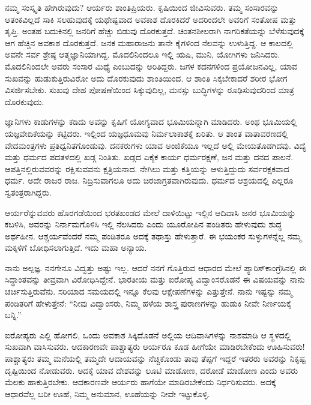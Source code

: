 ನಮ್ಮ ಸಂಸ್ಕೃತಿ ಹೇಗಿರುವುದು? ಆರ್ಯರು ಶಾಂತಿಪ್ರಿಯರು. ಕೃಷಿಯಿಂದ ಜೀವಿಸು\break ವರು. ತಮ್ಮ ಸಂಸಾರವನ್ನು ಆತಂಕವಿಲ್ಲದೆ ಸಾಕಿ ಸಲಹುವುದಕ್ಕೆ ಯಥೇಷ್ಟವಾದ ಅವಕಾಶ ದೊರಕಿದರೆ ಅದರಿಂದಲೇ ಅವರಿಗೆ ಸಂತೋಷ ಮತ್ತು ತೃಪ್ತಿ. ಅಂತಹ ಬದುಕಿನಲ್ಲಿ ಜನರಿಗೆ ಹೆಚ್ಚು ಬಿಡುವು ದೊರಕುತ್ತದೆ. ಚಿಂತನಶೀಲರಾಗಿ ನಾಗರಿಕತೆಯನ್ನು ಬೆಳೆಸುವುದಕ್ಕೆ ಆಗ ಹೆಚ್ಚಿನ ಅವಕಾಶ ದೊರಕುತ್ತದೆ. ಜನಕ ಮಹಾರಾಜನು ತಾನೇ ಕೈಗಳಿಂದ ನೆಲವನ್ನು ಉಳುತ್ತಿದ್ದ. ಆ ಕಾಲದಲ್ಲಿ ಅವನೇ ಸರ್ವ ಶ್ರೇಷ್ಠ ಆತ್ಮಜ್ಞಾನಿಯಾಗಿದ್ದ. ಮೊದಲಿನಿಂದಲೂ ಇಲ್ಲಿ ಋಷಿ, ಮುನಿ, ಯೋಗಿಗಳು ಜನಿಸಿದರು. ಮೊದಲಿನಿಂದಲೇ ಅವರು ಸಂಸಾರ ಮಿಥ್ಯೆ ಎಂಬುದನ್ನು ಅರಿತಿದ್ದರು. ಜಗಳ ಕದನಗಳಿಂದ ಪ್ರಯೋಜನವಿಲ್ಲ, ಯಾವ ಸುಖವನ್ನು ಹುಡುಕುತ್ತಿರುವಿರೋ ಅದು ದೊರಕುವುದು ಶಾಂತಿಯಿಂದ. ಆ ಶಾಂತಿ ಸಿಕ್ಕಬೇಕಾದರೆ ಶರೀರ ಭೋಗ ವಿಸರ್ಜಿಸಬೇಕು. ಸುಖವು ದೇಹ ಪೋಷಣೆಯಿಂದ ಸಿಕ್ಕುವುದಿಲ್ಲ, ಮನಸ್ಸು ಬುದ್ಧಿಗಳನ್ನು ರೂಢಿಸುವುದರಿಂದ ಮಾತ್ರ ದೊರಕುವುದು.

ಜ್ಞಾನಿಗಳು ಕಾಡುಗಳನ್ನು ಕಡಿದು ಅವನ್ನು ಕೃಷಿಗೆ ಯೋಗ್ಯವಾದ ಭೂಮಿಯನ್ನಾಗಿ ಮಾಡಿದರು. ಅಂಥ ಭೂಮಿಯಲ್ಲಿ ಯಜ್ಞವೇದಿಕೆಯನ್ನು ಕಟ್ಟಿದರು. ಇಲ್ಲಿಂದ ಯಜ್ಞ\break ಧೂಮವು ನಿರ್ಮಲಾಕಾಶಕ್ಕೆ ಏರಿತು. ಆ ಶಾಂತ ವಾತಾವರಣದಲ್ಲಿ ವೇದಮಂತ್ರಗಳು ಪ್ರತಿಧ್ವನಿತಗೊಂಡುವು. ದನಕರುಗಳು ಯಾವ ಅಂಜಿಕೆಯೂ ಇಲ್ಲದೆ ಅಲ್ಲಿ ಮೇಯ\break ತೊಡಗಿದವು. ವಿದ್ಯೆ ಮತ್ತು ಧರ್ಮದ ಪದತಳದಲ್ಲಿ ಖಡ್ಗ ನಿಂತಿತು. ಖಡ್ಗದ ಏಕೈಕ ಕಾರ್ಯ ಧರ್ಮರಕ್ಷಣೆ, ಜನ ಮತ್ತು ದನದ ಪಾಲನೆ. ಆಪತ್ತಿನಲ್ಲಿರುವವರನ್ನು ರಕ್ಷಿಸುವವನು ಕ್ಷತ್ರಿಯನಾದ. ನೇಗಿಲು ಮತ್ತು ಕತ್ತಿಯನ್ನು ಆಳುತ್ತಿದ್ದುದು ಸರ್ವರಕ್ಷಕವಾದ ಧರ್ಮ. ಅದೇ ರಾಜರ ರಾಜ. ನಿದ್ರಿಸುವಾಗಲೂ ಅದು ಚಿರಜಾಗ್ರತವಾಗಿರುವುದು. ಧರ್ಮದ ಆಶ್ರಯದಲ್ಲಿ ಎಲ್ಲರೂ ಸ್ವತಂತ್ರರಾಗಿದ್ದರು.

ಆರ್ಯರೆನ್ನುವವರು ಹೊರಗಡೆಯಿಂದ ಭರತಖಂಡದ ಮೇಲೆ ದಾಳಿಯಿಟ್ಟು ಇಲ್ಲಿನ ಆದಿವಾಸಿ ಜನರ ಭೂಮಿಯನ್ನು ಕಬಳಿಸಿ, ಅವರನ್ನು ನಿರ್ನಾಮಗೊಳಿಸಿ ಇಲ್ಲಿ ನೆಲಸಿದರು ಎಂದು ಯೂರೋಪಿನ ಪಂಡಿತರು ಹೇಳುವುದು ಶುದ್ಧ ಅರ್ಥಹೀನ. ಆಶ್ಚರ್ಯವೆಂದರೆ ನಮ್ಮ ಪಂಡಿತರೂ ಅದಕ್ಕೆ ತಥಾಸ್ತು ಹೇಳುತ್ತಾರೆ. ಈ ಭಯಂಕರ ಸುಳ್ಳುಗಳನ್ನೆಲ್ಲ ನಮ್ಮ ಮಕ್ಕಳಿಗೆ ಬೋಧಿಸಲಾಗುತ್ತಿದೆ. ಇದು ಮಹಾ ಅನ್ಯಾಯ.

ನಾನು ಅಲ್ಪಜ್ಞ. ನನಗೇನೂ ವಿದ್ವತ್ತು ಅಷ್ಟು ಇಲ್ಲ. ಆದರೆ ನನಗೆ ಗೊತ್ತಿರುವ ಆಧಾರದ ಮೇಲೆ ಪ್ಯಾರಿಸ್​ ಕಾಂಗ್ರೆಸಿನಲ್ಲಿ ಈ ಸಿದ್ಧಾಂತವನ್ನು ತೀವ್ರವಾಗಿ ವಿರೋಧಿಸಿದ್ದೇನೆ. ಭಾರತೀಯ ಮತ್ತು ಐರೋಪ್ಯ ವಿದ್ವಾಂಸರೊಡನೆ ಈ ವಿಷಯವನ್ನು ನಾನು ಚರ್ಚಿಸುತ್ತಿರು\break ವೆನು. ಸರಿಯಾದ ಸಮಯದಲ್ಲಿ ಇನ್ನೂ ಕೆಲವು ಆಕ್ಷೇಪಣೆಗಳನ್ನು ಎತ್ತುತ್ತೇನೆ. ನಾನು ಇಷ್ಟನ್ನು ನಮ್ಮ ಪಂಡಿತರಿಗೆ ಹೇಳುತ್ತೇನೆ: “ನೀವು ವಿದ್ವಾಂಸರು, ನಿಮ್ಮ ಹಳೆಯ ಶಾಸ್ತ್ರ ಪುರಾಣಗಳನ್ನು ಹುಡುಕಿ ನೀವೇ ನಿರ್ಣಯಕ್ಕೆ ಬನ್ನಿ.”

ಐರೋಪ್ಯರು ಎಲ್ಲಿ ಹೋಗಲಿ, ಒಂದು ಅವಕಾಶ ಸಿಕ್ಕಿದೊಡನೆ ಅಲ್ಲಿಯ ಆದಿವಾಸಿ\break ಗಳನ್ನು ನಾಶಮಾಡಿ ಆ ಸ್ಥಳದಲ್ಲಿ ಸುಖವಾಗಿ ವಾಸಿಸುವರು. ಆದಕಾರಣವೇ ಪಾಶ್ಚಾತ್ಯರು ಆರ್ಯರೂ ಕೂಡ ಹೀಗೆಯೇ ಮಾಡಿರಬೇಕೆಂದು ಊಹಿಸುವರು! ಪಾಶ್ಚಾತ್ಯರು ತಮ್ಮ ಮನೆಯಲ್ಲಿ ತಮ್ಮದೇ ಆದಾಯವನ್ನು ನೆಚ್ಚಿಕೊಂಡು ತಾವು ತೆಪ್ಪಗೆ ಇದ್ದರೆ ಇತರರು ಅವರನ್ನು ನಿಕೃಷ್ಟ ದೃಷ್ಟಿಯಿಂದ ನೋಡುವರು. ಅದಕ್ಕೆ ಯಾವ ದೇಶವನ್ನು ಲೂಟಿ ಮಾಡೋಣ, ದರೋಡೆ ಮಾಡೋಣ ಎಂದು ಅವರು ಮೆಲಕು ಹಾಕುತ್ತಿರಬೇಕು. ಆದಕಾರಣವೇ ಆರ್ಯರು ಹಾಗೆಯೇ ಮಾಡಿರಬೇಕೆಂದು ನಿರ್ಧರಿಸುವರು. ಅದಕ್ಕೆ ಆಧಾರವೆಲ್ಲ ಬರೀ ಊಹೆ, ನಿಮ್ಮ ಅನುಮಾನ, ಊಹೆಯನ್ನು ನೀವೇ ಇಟ್ಟುಕೊಳ್ಳಿ.


